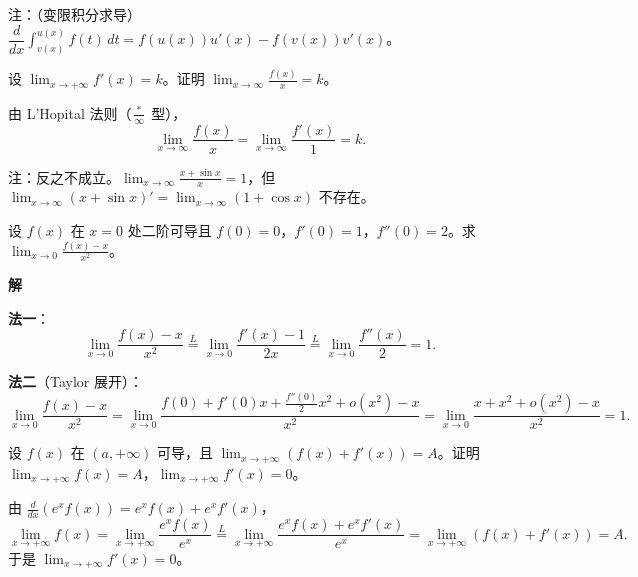 \documentclass[lang=cn,chinesefont=founder,10pt]{elegantbook}
\renewenvironment{proof}[1][\proofname]{
  \par\noindent\textbf{\color{second}#1\;}\par\noindent
  \color{black!90}\cfs}{
  \par}
\begin{document}
\begin{remark}
    注：（变限积分求导）$\dfrac{d}{dx}\displaystyle\int_{v(x)}^{u(x)} f(t)\,dt = f(u(x))u'(x) - f(v(x))v'(x)$。
\end{remark}

\begin{example}
    设 $\displaystyle\lim_{x \to +\infty} f'(x) = k$。证明 $\displaystyle\lim_{x \to \infty} \frac{f(x)}{x} = k$。
\end{example}

\begin{proof}
    由 L'Hopital 法则（$\frac{*}{\infty}$ 型），
    \[
        \lim_{x \to \infty} \frac{f(x)}{x} = \lim_{x \to \infty} \frac{f'(x)}{1} = k.
    \]
\end{proof}

\begin{remark}
    注：反之不成立。$\displaystyle\lim_{x \to \infty} \frac{x+\sin x}{x} = 1$，但 $\lim_{x \to \infty} (x+\sin x)' = \lim_{x \to \infty}(1+\cos x)$ 不存在。
\end{remark}

\begin{example}
    设 $f(x)$ 在 $x=0$ 处二阶可导且 $f(0)=0$，$f'(0)=1$，$f''(0)=2$。求 $\displaystyle\lim_{x \to 0}\frac{f(x)-x}{x^2}$。
\end{example}

\begin{proof}[解]
    \textbf{法一}：
    \[
        \lim_{x \to 0} \frac{f(x)-x}{x^2}
        \stackrel{L}{=} \lim_{x \to 0} \frac{f'(x)-1}{2x}
        \stackrel{L}{=} \lim_{x \to 0} \frac{f''(x)}{2}
        = 1.
    \]

    \textbf{法二}（Taylor 展开）：
    \[
        \lim_{x \to 0} \frac{f(x)-x}{x^2}
        = \lim_{x \to 0} \frac{f(0) + f'(0)x + \frac{f''(0)}{2}x^2 + o(x^2) - x}{x^2}
        = \lim_{x \to 0} \frac{x + x^2 + o(x^2) - x}{x^2}
        = 1.
    \]
\end{proof}


\begin{example}
    设 $f(x)$ 在 $(a,+\infty)$ 可导，且 $\displaystyle\lim_{x \to +\infty} (f(x)+f'(x)) = A$。证明 $\displaystyle\lim_{x \to +\infty} f(x) = A$，$\displaystyle\lim_{x \to +\infty} f'(x) = 0$。
\end{example}

\begin{proof}
    由 $\frac{d}{dx}\left(e^x f(x)\right) = e^x f(x) + e^x f'(x)$，
    \[
        \lim_{x \to +\infty} f(x)
        = \lim_{x \to +\infty} \frac{e^x f(x)}{e^x}
        \stackrel{L}{=} \lim_{x \to +\infty} \frac{e^x f(x) + e^x f'(x)}{e^x}
        = \lim_{x \to +\infty} (f(x)+f'(x))
        = A.
    \]
    于是 $\lim_{x \to +\infty} f'(x) = 0$。
\end{proof}
\end{document}
